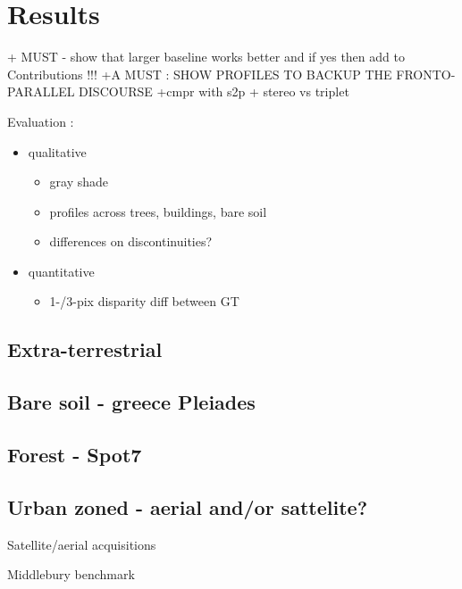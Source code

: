 \documentclass[journal]{IEEEtran}
\begin{document}
\subsection{}


\section{Results}
+ MUST - show that larger baseline works better and if yes then add to Contributions !!!
+A MUST : SHOW PROFILES TO BACKUP THE FRONTO-PARALLEL DISCOURSE
+cmpr with s2p
+ stereo vs triplet


Evaluation : \\
\begin{itemize}
\item qualitative  
	\begin{itemize}
	\item gray shade
	\item profiles across trees, buildings, bare soil
	\item differences on discontinuities?
	\end{itemize}
\item quantitative 
	\begin{itemize}
	\item 1-/3-pix disparity diff between GT 
	\end{itemize}
\end{itemize}
%
%
\subsection{Extra-terrestrial}
\subsection{Bare soil - greece Pleiades}
\subsection{Forest - Spot7}
\subsection{Urban zoned - aerial and/or sattelite?}

{Satellite/aerial acquisitions}

Middlebury benchmark

\end{document}
